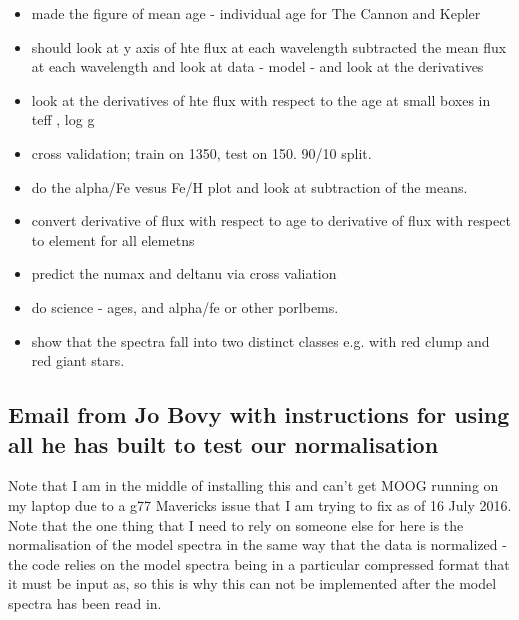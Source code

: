 \documentclass[11pt]{amsart}
\begin{document}
\begin{itemize}
\item made the figure of mean age - individual age for The Cannon and Kepler
\item should look at y axis of hte flux at each wavelength subtracted the mean flux at each wavelength and look at data  - model - and look at the derivatives
\end{itemize} 

\begin{itemize}
\item look at the derivatives of hte flux with respect to the age at small boxes in teff , log g
\item cross validation; train on 1350, test on 150. 90/10 split.
\item do the alpha/Fe vesus Fe/H plot and look at subtraction of the means.
\item convert derivative of flux with respect to age to derivative of flux with respect to element for all elemetns
\item predict the numax and deltanu via cross valiation
\item do science - ages, and alpha/fe or other porlbems. 
\item show that the spectra fall into two distinct classes e.g. with red clump and red giant stars. 
\end{itemize} 



\pagebreak

\subsection{Email from Jo Bovy with instructions for using all he has built to test our normalisation} 
\vspace{20pt}

Note that I am in the middle of installing this and can't get MOOG running on my laptop due to a g77 Mavericks issue that I am trying to fix as of 16 July 2016.\\

Note that the one thing that I need to rely on someone else for here is the normalisation of the model spectra in the same way that the data is normalized - the code relies on the model spectra being in a particular compressed format that it must be input as, so this is why this can not be implemented after the model spectra has been read in. \\
\end{document}
